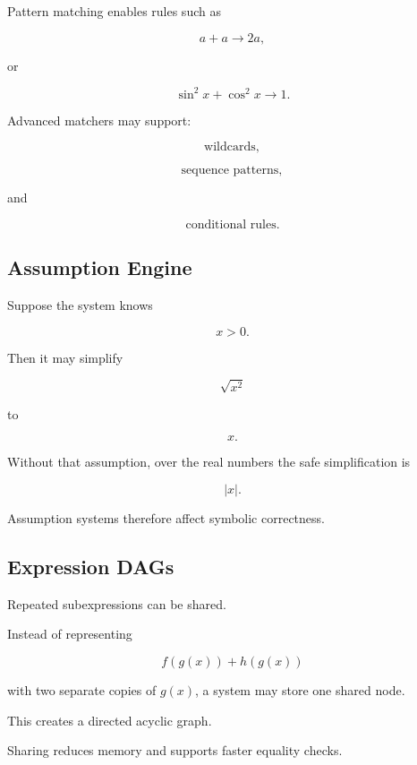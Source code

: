 Pattern matching enables rules such as

\[
\boxed{
a+a
\longrightarrow
2a,
}
\]

or

\[
\boxed{
\sin^2x+\cos^2x
\longrightarrow
1.
}
\]

Advanced matchers may support:

\[
\boxed{
\text{wildcards},
}
\]

\[
\boxed{
\text{sequence patterns},
}
\]

and

\[
\boxed{
\text{conditional rules}.
}
\]

\subsection{Assumption Engine}
\label{subsec:cas-assumption-engine}

Suppose the system knows

\[
\boxed{
x>0.
}
\]

Then it may simplify

\[
\sqrt{x^2}
\]

to

\[
\boxed{
x.
}
\]

Without that assumption, over the real numbers the safe simplification is

\[
\boxed{
|x|.
}
\]

Assumption systems therefore affect symbolic correctness.

\subsection{Expression DAGs}
\label{subsec:cas-expression-dags}

Repeated subexpressions can be shared.

Instead of representing

\[
f(g(x))+h(g(x))
\]

with two separate copies of \(g(x)\), a system may store one shared node.

This creates a directed acyclic graph.

Sharing reduces memory and supports faster equality checks.

